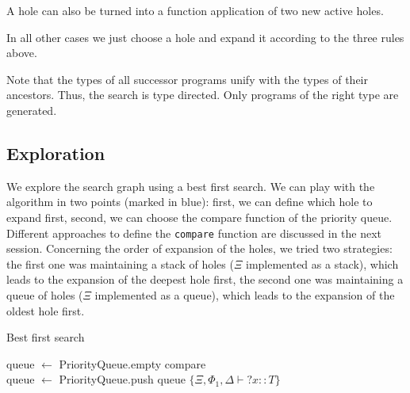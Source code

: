A hole can also be turned into a function application of two new active holes.
\begin{prooftree}
\end{prooftree}

In all other cases we just choose a hole and expand it according to the three rules above.
\begin{prooftree}
\end{prooftree}

Note that the types of all successor programs unify with the types of their ancestors. Thus, the search is type directed. Only programs of the right type are generated.


\subsection{Exploration}\label{Exploration}

We explore the search graph using a best first search.
We can play with the algorithm in two points (marked in blue): first, we can define which hole to expand first, second, we can choose the compare function of the priority queue.
Different approaches to define the \lstinline?compare? function are discussed in the next session.
Concerning the order of expansion of the holes, we tried two strategies: the first one was maintaining a stack of holes ($\Xi$ implemented as a stack), which leads to the expansion of the deepest hole first, the second one was maintaining a queue of holes ($\Xi$ implemented as a queue), which leads to the expansion of the oldest hole first.

\begin{algorithm}
\caption{Best first search}

queue $\gets$ PriorityQueue.empty {\color{blue}compare}\\
queue $\gets$ PriorityQueue.push queue $\{\Xi, \Phi_1, \Delta \vdash {?x} :: T\}$\\

\end{algorithm}

